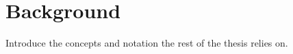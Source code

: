 \chapter{Background}
\label{ch:background}

Introduce the concepts and notation the rest of the thesis relies on.
